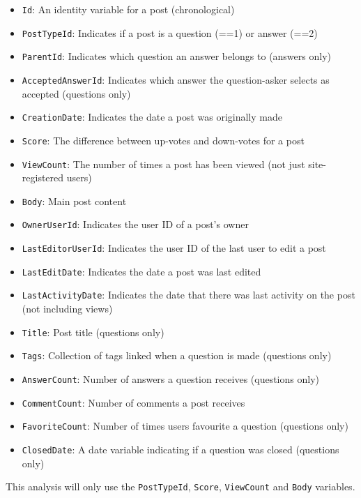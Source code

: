 \documentclass[11pt,preprint, authoryear]{article}
\numberwithin{equation}{section}
\numberwithin{figure}{section}
\numberwithin{table}{section}
\begin{document}
\begin{itemize}
\item
  \texttt{Id}: An identity variable for a post (chronological)
\item
  \texttt{PostTypeId}: Indicates if a post is a question (==1) or answer
  (==2)
\item
  \texttt{ParentId}: Indicates which question an answer belongs to
  (answers only)
\item
  \texttt{AcceptedAnswerId}: Indicates which answer the question-asker
  selects as accepted (questions only)
\item
  \texttt{CreationDate}: Indicates the date a post was originally made
\item
  \texttt{Score}: The difference between up-votes and down-votes for a
  post
\item
  \texttt{ViewCount}: The number of times a post has been viewed (not
  just site-registered users)
\item
  \texttt{Body}: Main post content
\item
  \texttt{OwnerUserId}: Indicates the user ID of a post's owner
\item
  \texttt{LastEditorUserId}: Indicates the user ID of the last user to
  edit a post
\item
  \texttt{LastEditDate}: Indicates the date a post was last edited
\item
  \texttt{LastActivityDate}: Indicates the date that there was last
  activity on the post (not including views)
\item
  \texttt{Title}: Post title (questions only)
\item
  \texttt{Tags}: Collection of tags linked when a question is made
  (questions only)
\item
  \texttt{AnswerCount}: Number of answers a question receives (questions
  only)
\item
  \texttt{CommentCount}: Number of comments a post receives
\item
  \texttt{FavoriteCount}: Number of times users favourite a question
  (questions only)
\item
  \texttt{ClosedDate}: A date variable indicating if a question was
  closed (questions only)
\end{itemize}


This analysis will only use the \texttt{PostTypeId}, \texttt{Score},
\texttt{ViewCount} and \texttt{Body} variables.
\end{document}
